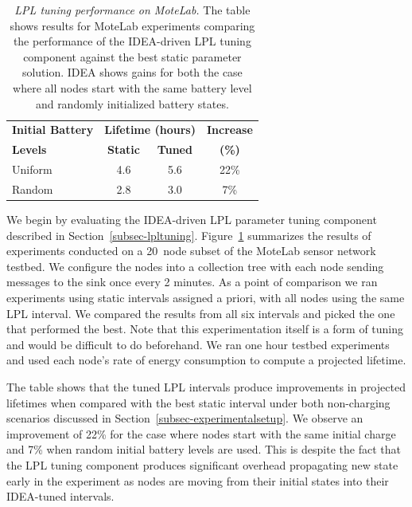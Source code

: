 \begin{table}[t]
\begin{center}
\begin{tabular}{|l|ccc|}
\hline
\textbf{Initial Battery} & \multicolumn{2}{c}{\textbf{Lifetime (hours)}} & \textbf{Increase} \\
\textbf{Levels} & \textbf{Static} & \textbf{Tuned} & \textbf{(\%)} \\ \hline
Uniform & 4.6 & 5.6 & 22\% \\
Random & 2.8 & 3.0 & 7\% \\ \hline
\end{tabular}
\end{center}

\caption{\textit{LPL tuning performance on MoteLab.} The table shows results
for MoteLab experiments comparing the performance of the IDEA-driven LPL
tuning component against the best static parameter solution. IDEA shows gains
for both the case where all nodes start with the same battery level and
randomly initialized battery states.}

\label{table-lplvoptimalmotelab}
\end{table}

We begin by evaluating the IDEA-driven LPL parameter tuning component
described in Section~\ref{subsec-lpltuning}.
Figure~\ref{table-lplvoptimalmotelab} summarizes the results of experiments
conducted on a 20~node subset of the MoteLab sensor network testbed. We
configure the nodes into a collection tree with each node sending messages to
the sink once every 2 minutes. As a point of comparison we ran experiments
using static intervals assigned a priori, with all nodes using the same LPL
interval. We compared the results from all six intervals and picked the one
that performed the best. Note that this experimentation itself is a form of
tuning and would be difficult to do beforehand. We ran one hour testbed
experiments and used each node's rate of energy consumption to compute a
projected lifetime.

The table shows that the tuned LPL intervals produce improvements in
projected lifetimes when compared with the best static interval under both
non-charging scenarios discussed in Section~\ref{subsec-experimentalsetup}.
We observe an improvement of 22\% for the case where nodes start with the
same initial charge and 7\% when random initial battery levels are used. This
is despite the fact that the LPL tuning component produces significant
overhead propagating new state early in the experiment as nodes are moving
from their initial states into their IDEA-tuned intervals.

